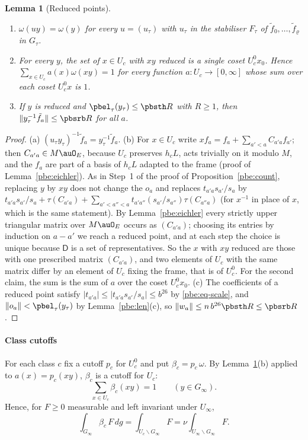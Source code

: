 \documentclass[10pt]{amsart}
\newtheorem{lemma}[theorem]{Lemma}
\theoremstyle{definition}
\theoremstyle{remark}
\begin{document}
\begin{lemma}[Reduced points]\label{pbs:reduced}
\begin{enumerate}
\item[(a)] $\omega(uy)=\omega(y)$ for every $u=(u_\tau)$ with $u_\tau$ in the stabiliser $F_\tau$
of $\tilde f_0,\dots,\tilde f_\varrho$ in $G_\tau$.
\item[(b)] For every $y$, the set of $x\in U_c$ with $xy$ reduced is a single coset $U_c^0x_0$.
Hence $\sum_{x\in U_c}a(x)\omega(xy)=1$ for every function $a\colon U_c\to[0,\infty]$ whose sum
over each coset $U^0_cx$ is $1$.
\item[(c)] If $y$ is reduced and $\pbel_\tau(y_\tau)\le\pbsth R$ with $R\ge1$, then
$\|y_\tau^{-1}\tilde f_a\|\le\pbsrb R$ for all $a$.
\end{enumerate}
\end{lemma}
\begin{proof}
(a) $(u_\tau y_\tau)^{-1}\tilde f_a=y_\tau^{-1}\tilde f_a$. (b) For $x\in U_c$ write $xf_a=f_a+\sum_{a'
<a}C_{a'a}f_{a'}$; then $C_{a'a}\in M\auO_E$, because $U_c$ preserves $h_cL$, acts trivially on it
modulo $M$, and the $f_a$ are part of a basis of $h_cL$ adapted to the frame (proof of
Lemma~\ref{pbe:eichler}). As in Step~1 of the proof of Proposition~\ref{pbe:count}, replacing $y$
by $xy$ does not change the $o_a$ and replaces $t_{a'a}s_{a'}/s_a$ by $t_{a'a}s_{a'}/s_a+\tau(
C_{a'a})+\sum_{a'<a''<a}t_{a'a''}(s_{a'}/s_{a''})\tau(C_{a''a})$ (for $x^{-1}$ in place of $x$, which
is the same statement). By Lemma~\ref{pbe:eichler} every strictly upper triangular matrix over
$M\auO_E$ occurs as $(C_{a'a})$; choosing its entries by induction on $a-a'$ we reach a reduced
point, and at each step the choice is unique because $\mathsf D$ is a set of representatives. So
the $x$ with $xy$ reduced are those with one prescribed matrix $(C_{a'a})$, and two elements of
$U_c$ with the same matrix differ by an element of $U_c$ fixing the frame, that is of $U_c^0$. For
the second claim, the sum is the sum of $a$ over the coset $U^0_cx_0$. (c) The coefficients of a
reduced point satisfy $|t_{a'a}|\le|t_{a'a}s_{a'}/s_a|\le b^{26}$ by \eqref{pbe:eq-scale}, and
$\|o_a\|<\pbel_\tau(y_\tau)$ by Lemma~\ref{pbe:len}(c), so $\|w_a\|\le n\,b^{26}\pbsth R\le\pbsrb R$.
\end{proof}

\paragraph*{Class cutoffs} For each class $c$ fix a cutoff $p_c$ for $U_c^0$ and put
$\beta_c=p_c\,\omega$. By Lemma~\ref{pbs:reduced}(b) applied to $a(x)=p_c(xy)$, $\beta_c$ is a
cutoff for $U_c$:
\begin{equation}\label{pbs:eq-cutoff}
\sum_{x\in U_c}\beta_c(xy)=1\qquad(y\in G_\infty).
\end{equation}
Hence, for $F\ge0$ measurable and left invariant under $U_\infty$,
\begin{equation}\label{pbs:eq-nu}
\int_{G_\infty}\beta_c\,F\,dg=\int_{U_c\backslash G_\infty}F=\nu\int_{U_\infty\backslash G_\infty}F .
\end{equation}
\end{document}

